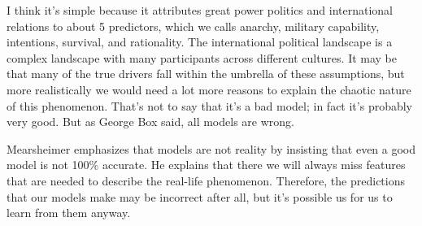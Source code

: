 \documentclass[12pt]{article}
\begin{document}
\begin{enumerate}
I think it's simple because it attributes great power politics and international relations to
about 5 predictors, which we calls anarchy, military capability, intentions, survival, and rationality.
The international political landscape is a complex landscape with many participants across different cultures.
It may be that many of the true drivers fall within the umbrella of these assumptions, but
more realistically we would need a lot more reasons to explain the chaotic nature of this phenomenon.
That's not to say that it's a bad model; in fact it's probably very good. But as George Box said,
all models are wrong.

 

Mearsheimer emphasizes that models are not reality by insisting that even a good model is not
100\% accurate. He explains that there we will always miss features that are needed to describe
the real-life phenomenon. Therefore, the predictions that our models make may be incorrect after
all, but it's possible us for us to learn from them anyway.


\end{enumerate}
\end{document}
